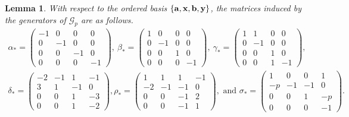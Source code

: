 \documentclass{amsart}     %
\newcommand{\set}[1]{ \left\{ #1 \right\} }
\newtheorem{lem}[thm]{Lemma}          %
\theoremstyle{definition}
\begin{document}
\begin{lem}
\label{lemma:matrices}
With respect to the ordered basis $\set{\bf{a}, \bf{x}, \bf{b}, \bf{y}}$, the matrices induced by the generators of $\mathcal{G}_p$ are as follows.
\begin{gather*}
\alpha_* = \begin{pmatrix} -1 & 0 & 0 & 0 \\ 0 & -1 & 0 & 0 \\ 0 & 0 & -1 & 0 \\ 0 & 0 & 0 & -1\end{pmatrix},\  \beta_*  = \begin{pmatrix} 1 & 0 & 0 & 0 \\ 0 & -1 & 0 & 0 \\ 0 & 0 & 1 & 0 \\ 0 & 0 & 0 & -1\end{pmatrix}, \ \gamma_*  = \begin{pmatrix} 1 & 1 & 0 & 0 \\ 0 & -1 & 0 & 0 \\ 0 & 0 & 1 & 0 \\ 0 & 0 & 1 & -1\end{pmatrix},   \\ 
\delta_*   =  \begin{pmatrix} -2 & -1 & 1 & -1 \\ 3 & 1 & -1 & 0 \\ 0 & 0 & 1 & -3 \\ 0 & 0 & 1 & -2\end{pmatrix}, \rho_*   =  \begin{pmatrix} 1 & 1 & 1 & -1 \\ -2 & -1 & -1 & 0 \\ 0 & 0 & -1 & 2 \\ 0 & 0 & -1 & 1\end{pmatrix},\mbox{ and } \sigma_* = \begin{pmatrix} 1 & 0 & 0 & 1 \\ -p & -1 & -1 & 0 \\ 0 & 0 & 1 & -p \\ 0 & 0 & 0 & -1 \end{pmatrix}.
\end{gather*}
\end{lem}
\end{document}
